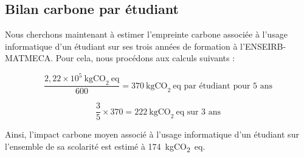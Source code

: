 \subsection{Bilan carbone par étudiant}

Nous cherchons maintenant à estimer l’empreinte carbone associée à l’usage informatique d’un étudiant sur ses trois années de formation à l’ENSEIRB-MATMECA. Pour cela, nous procédons aux calculs suivants :

\[
\frac{2{,}22 \times 10^5~\text{kgCO}_2~\text{eq}}{600} = 370~\text{kgCO}_2~\text{eq par étudiant pour 5 ans}
\]

\[
\frac{3}{5} \times 370 = 222~\text{kgCO}_2~\text{eq sur 3 ans}
\]

Ainsi, l’impact carbone moyen associé à l’usage informatique d’un étudiant sur l’ensemble de sa scolarité est estimé à 174~kgCO\textsubscript{2}~eq.
